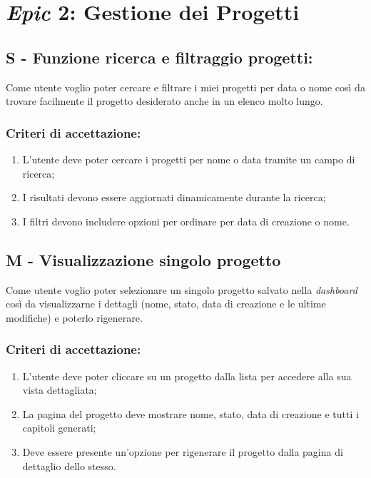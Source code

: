 \vspace{0.5cm}

\section*{\textit{Epic} 2: Gestione dei Progetti}

\subsection*{S - Funzione ricerca e filtraggio progetti:}

\noindent Come utente voglio poter cercare e filtrare i miei progetti per data o nome così da trovare facilmente il progetto desiderato anche in un elenco molto lungo. 

\subsubsection*{Criteri di accettazione:}

\begin{enumerate}
    \item L'utente deve poter cercare i progetti per nome o data tramite un campo di ricerca;
    \item I risultati devono essere aggiornati dinamicamente durante la ricerca;
    \item I filtri devono includere opzioni per ordinare per data di creazione o nome.
\end{enumerate}

\vspace{0.5cm}

\subsection*{M - Visualizzazione singolo progetto}

\noindent Come utente voglio poter selezionare un singolo progetto salvato nella \textit{dashboard} così da visualizzarne i dettagli (nome, stato, data di creazione e le ultime modifiche) e poterlo rigenerare. 

\subsubsection*{Criteri di accettazione:}

\begin{enumerate}
    \item L'utente deve poter cliccare su un progetto dalla lista per accedere alla sua vista dettagliata;
    \item La pagina del progetto deve mostrare nome, stato, data di creazione e tutti i capitoli generati;
    \item Deve essere presente un'opzione per rigenerare il progetto dalla pagina di dettaglio dello stesso.
\end{enumerate}


